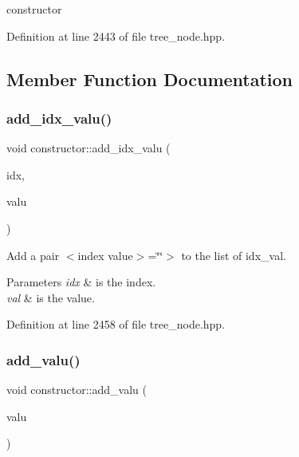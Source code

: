 constructor 



Definition at line 2443 of file tree\+\_\+node.\+hpp.



\subsection{Member Function Documentation}
\mbox{\label{structconstructor_a8c1ec0444fc120cdd26e22e3425a2d7e}} 
\subsubsection{\texorpdfstring{add\+\_\+idx\+\_\+valu()}{add\_idx\_valu()}}
{\footnotesize\ttfamily void constructor\+::add\+\_\+idx\+\_\+valu (\begin{DoxyParamCaption}\item[{const \hyperlink{tree__node_8hpp_a6ee377554d1c4871ad66a337eaa67fd5}{tree\+\_\+node\+Ref} \&}]{idx,  }\item[{const \hyperlink{tree__node_8hpp_a6ee377554d1c4871ad66a337eaa67fd5}{tree\+\_\+node\+Ref} \&}]{valu }\end{DoxyParamCaption})\hspace{0.3cm}{\ttfamily [inline]}}



Add a pair $<$index value$>$=\char`\"{}\char`\"{}$>$ to the list of idx\+\_\+val. 


\begin{DoxyParams}{Parameters}
{\em idx} & is the index. \\
\hline
{\em val} & is the value. \\
\hline
\end{DoxyParams}


Definition at line 2458 of file tree\+\_\+node.\+hpp.

\mbox{\label{structconstructor_a61e1defa27b46a8dcd1960e2beaf2ae8}} 
\subsubsection{\texorpdfstring{add\+\_\+valu()}{add\_valu()}}
{\footnotesize\ttfamily void constructor\+::add\+\_\+valu (\begin{DoxyParamCaption}\item[{const \hyperlink{tree__node_8hpp_a6ee377554d1c4871ad66a337eaa67fd5}{tree\+\_\+node\+Ref} \&}]{valu }\end{DoxyParamCaption})\hspace{0.3cm}{\ttfamily [inline]}}



